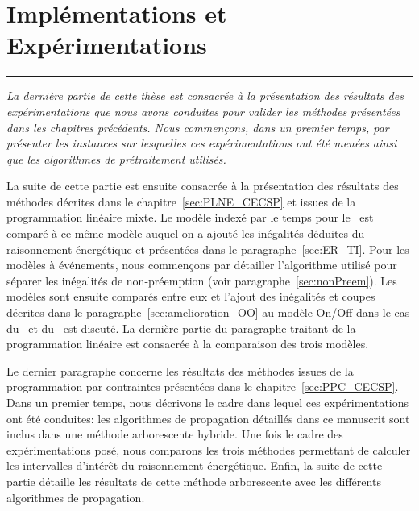 \cleardoublepage
\begin{minipage}{0.95\linewidth}

\part{Implémentations et Expérimentations}
\label{sec:expe}
\vspace{15mm} %
\parttoc 
\end{minipage}
\newpage
\thispagestyle{empty}
\begin{center}
  \begin{minipage}{\textwidth}
    \hrule
    \vspace{0.5cm}
    {\it  La dernière partie de cette thèse est consacrée à la
      présentation des résultats des expérimentations que nous avons
      conduites pour valider les méthodes présentées dans les
      chapitres précédents. Nous commençons, dans un premier temps,
      par présenter les instances sur lesquelles ces expérimentations
      ont été menées ainsi que les algorithmes de prétraitement
      utilisés. 

      La suite de cette partie est ensuite consacrée à la présentation
      des résultats des méthodes décrites dans le
      chapitre~\ref{sec:PLNE_CECSP} et issues de la programmation linéaire
      mixte. Le modèle indexé par le temps pour le \CECSP~est comparé
      à ce même modèle auquel on a ajouté les inégalités déduites du
      raisonnement énergétique et présentées dans le
      paragraphe~\ref{sec:ER_TI}. Pour les modèles à événements, nous
      commençons par détailler l'algorithme utilisé pour séparer les
      inégalités de non-préemption (voir
      paragraphe~\ref{sec:nonPreem}). Les modèles sont ensuite comparés
      entre eux et l'ajout des inégalités et coupes décrites dans le
      paragraphe~\ref{sec:amelioration_OO} au modèle On/Off dans le cas du
      \CECSP~et du \RCPSP~est discuté. La dernière partie du paragraphe
      traitant de la programmation linéaire est consacrée à la comparaison
      des trois modèles.

      Le dernier paragraphe concerne les résultats des méthodes issues de
      la programmation par contraintes présentées dans le
      chapitre~\ref{sec:PPC_CECSP}. Dans un premier temps, nous
      décrivons le cadre dans lequel ces expérimentations ont été
      conduites: les algorithmes de propagation détaillés dans ce manuscrit
      sont inclus dans une méthode arborescente hybride. Une fois le cadre
      des expérimentations posé, nous comparons les trois méthodes permettant
      de calculer les intervalles d'intérêt du raisonnement
      énergétique. Enfin, la suite de cette partie détaille les résultats de
      cette méthode arborescente avec les différents algorithmes de
      propagation. 

}
\end{minipage}
\end{center}
